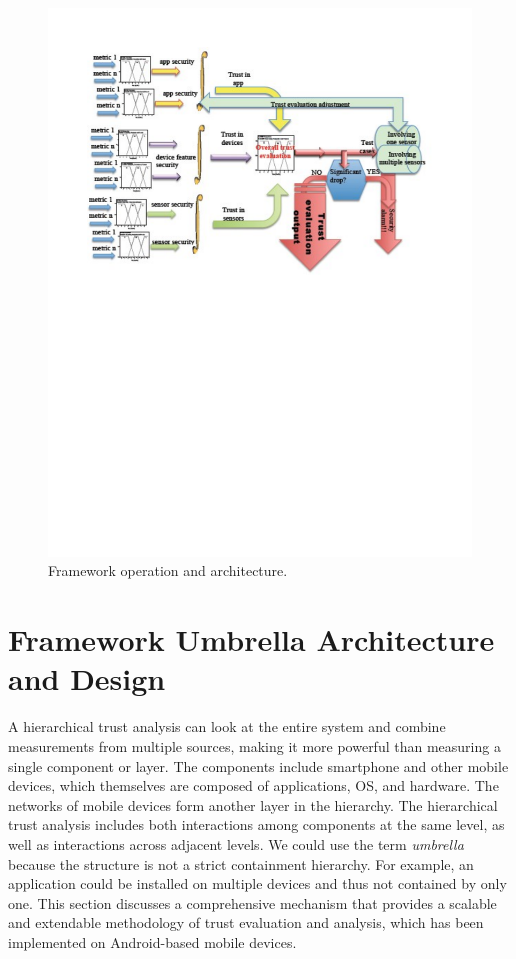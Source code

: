 \begin{figure}[ht]
\centering
\includegraphics[width=5.6in]{umbrella_framework.pdf}
\caption{Framework operation and architecture.}
\label{fig:umbrella}
\end{figure}

\section{Framework Umbrella Architecture and Design}\label{sec-umbrella}

A hierarchical trust analysis can look at the entire system and combine measurements from multiple sources, making
it more powerful than measuring a single component or layer.  The components include smartphone and other mobile
devices, which themselves are composed of applications, OS, and hardware. The networks of mobile devices form another 
layer in the hierarchy.  The hierarchical trust analysis includes both interactions among components at the same level,
as well as interactions across adjacent levels.  We could use the term {\it umbrella} because the structure is not
a strict containment hierarchy.  For example, an application could be installed on multiple devices and thus not
contained by only one.
This section discusses a comprehensive mechanism that provides a scalable and extendable methodology of trust
 evaluation and analysis, which has been implemented on Android-based mobile devices.
 
